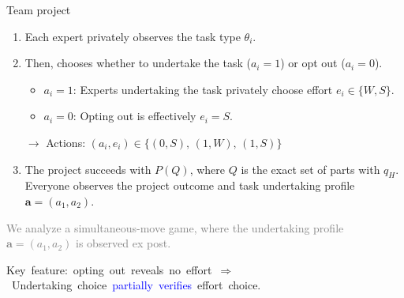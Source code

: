 \documentclass[10pt,aspectratio=169, compressed]{beamer}
\begin{document}
\begin{frame}{Team project}

\begin{enumerate}
\item Each expert privately observes the task type $\theta_i$.
\smallskip

\item Then, chooses whether to undertake the task ($a_i = 1$) or opt out ($a_i = 0$).

\begin{itemize}
  \item $a_i = 1$: Experts undertaking the task privately choose effort $e_i \in \{W, S\}$.\\[0.2em]
  \item $a_i = 0$: Opting out is effectively $e_i = S$.
\end{itemize}
$\to$ Actions: $(a_i, e_i) \in \{(0,S),\, (1,W),\, (1,S)\}$

\smallskip

\item The project succeeds with $P(Q)$, where $Q$ is the exact set of parts with $q_H$.\\
	Everyone observes the project outcome and task undertaking profile $\mathbf a = (a_1, a_2)$.
\end{enumerate}
\medskip



\textcolor{gray}{\small
We analyze a simultaneous-move game, 
where the undertaking profile $\mathbf a = (a_1, a_2)$ is observed ex post.}

\smallskip

\bigskip

\mbox{{Key feature}: opting out reveals no effort $\Rightarrow$ Undertaking choice \textcolor{blue}{partially verifies} effort choice.}

\bigskip
\smallskip


\end{frame}
\end{document}
